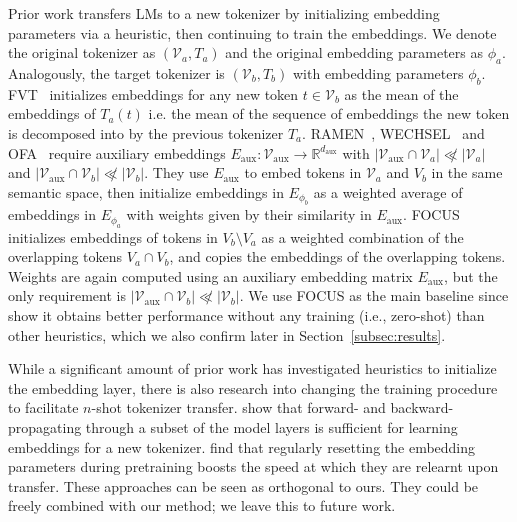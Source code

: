 \documentclass{article}
\begin{document}
Prior work transfers LMs to a new tokenizer by initializing embedding parameters via a heuristic, then continuing to train the embeddings. We denote the original tokenizer as $(\mathcal{V}_a, T_a)$ and the original embedding parameters as $\phi_a$. Analogously, the target tokenizer is $(\mathcal{V}_b, T_b)$ with embedding parameters $\phi_b$. \textsc{FVT}~\citep{gee-etal-2022-fast} initializes embeddings for any new token $t \in \mathcal{V}_b$ as the mean of the embeddings of $T_a(t)$ i.e. the mean of the sequence of embeddings the new token is decomposed into by the previous tokenizer $T_a$.
\textsc{RAMEN}~\citep{tran2020english}, \textsc{WECHSEL}~\citep{minixhofer-etal-2022-wechsel} and \textsc{OFA}~\citep{liu2023ofa} require auxiliary embeddings \(E_{\text{aux}}: \mathcal{V}_{\text{aux}} \rightarrow \mathbb{R}^{d_{\text{aux}}}\) with \(|\mathcal{V}_{\text{aux}} \cap \mathcal{V}_{a}| \not \ll |\mathcal{V}_{a}|\) and \(|\mathcal{V}_{\text{aux}} \cap \mathcal{V}_{b}| \not \ll |\mathcal{V}_{b}|\). They use \(E_{\text{aux}}\) to embed tokens in \(\mathcal{V}_{a}\) and \(V_{b}\) in the same semantic space, then initialize embeddings in \(E_{\phi_b}\) as a weighted average of embeddings in \(E_{\phi_a}\) with weights given by their similarity in \(E_{\text{aux}}\). \textsc{FOCUS}~\citep{dobler-de-melo-2023-focus} initializes embeddings of tokens in \(V_{b} \setminus V_{a}\) as a weighted combination of the overlapping tokens \(V_{a} \cap V_{b}\), and copies the embeddings of the overlapping tokens. Weights are again computed using an auxiliary embedding matrix \(E_{\text{aux}}\), but the only requirement is \(|\mathcal{V}_{\text{aux}} \cap \mathcal{V}_{b}| \not \ll |\mathcal{V}_{b}|\). We use \textsc{FOCUS} as the main baseline since \citet{dobler-de-melo-2023-focus} show it obtains better performance without any training (i.e., zero-shot) than other heuristics, which we also confirm later in Section~\ref{subsec:results}.

 While a significant amount of prior work has investigated heuristics to initialize the embedding layer, there is also research into changing the training procedure to facilitate $n$-shot tokenizer transfer. \citet{marchisio-etal-2023-mini} show that forward- and backward-propagating through a subset of the model layers is sufficient for learning embeddings for a new tokenizer. \citet{chen2023improving} find that regularly resetting the embedding parameters during pretraining boosts the speed at which they are relearnt upon transfer. These approaches can be seen as orthogonal to ours. They could be freely combined with our method; we leave this to future work.
\end{document}
